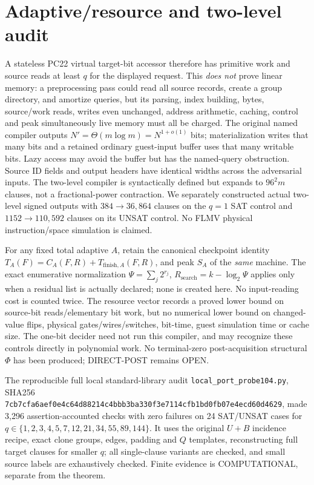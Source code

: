 \documentclass[11pt]{article}
\begin{document}
\section{Adaptive/resource and two-level audit}
A stateless PC22 virtual target-bit accessor therefore has primitive work and source reads at least \(q\) for the displayed request. This \emph{does not} prove linear memory: a preprocessing pass could read all source records, create a group directory, and amortize queries, but its parsing, index building, bytes, source/work reads, writes even unchanged, address arithmetic, caching, control and peak simultaneously live memory must all be charged. The original named compiler outputs \(N'=\Theta(m\log m)=N^{1+o(1)}\) bits; materialization writes that many bits and a retained ordinary guest-input buffer uses that many writable bits. Lazy access may avoid the buffer but has the named-query obstruction. Source ID fields and output headers have identical widths across the adversarial inputs. The two-level compiler is syntactically defined but expands to \(96^2m\) clauses, not a fractional-power contraction. We separately constructed actual two-level signed outputs with \(384\to36{,}864\) clauses on the \(q=1\) SAT control and \(1152\to110{,}592\) clauses on its UNSAT control. No FLMV physical instruction/space simulation is claimed.

For any fixed total adaptive \(A\), retain the canonical checkpoint identity \(T_A(F)=C_A(F,R)+T_{\mathrm{finish},A}(F,R)\), and peak \(S_A\) of the \emph{same} machine. The exact enumerative normalization \(\Psi=\sum_j2^{r_j}\), \(R_{\mathrm{search}}=k-\log_2\Psi\) applies only when a residual list is actually declared; none is created here. No input-reading cost is counted twice. The resource vector records a proved lower bound on source-bit reads/elementary bit work, but no numerical lower bound on changed-value flips, physical gates/wires/switches, bit-time, guest simulation time or cache size. The one-bit decider need not run this compiler, and may recognize these controls directly in polynomial work. No terminal-zero post-acquisition structural \(\Phi\) has been produced; DIRECT-POST remains OPEN.

The reproducible full local standard-library audit \texttt{local_port_probe104.py}, SHA256 \texttt{7cb7cfa6aef0e4c64d88214c4bbb3ba330f3e7114cfb1bd0fb07e4ecd60d4629}, made 3,296 assertion-accounted checks with zero failures on 24 SAT/UNSAT cases for \(q\in\{1,2,3,4,5,7,12,21,34,55,89,144\}\). It uses the original \(U+B\) incidence recipe, exact clone groups, edges, padding and \(Q\) templates, reconstructing full target clauses for smaller \(q\); all single-clause variants are checked, and small source labels are exhaustively checked. Finite evidence is COMPUTATIONAL, separate from the theorem.
\end{document}
